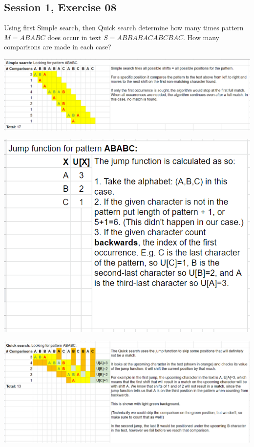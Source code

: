 \subsection{Session 1, Exercise 08}


Using first Simple search, then Quick search determine how many times pattern $M = ABABC$ does occur in text $S = ABBABACABCBAC$. How many comparisons are made in each case?



\includegraphics[width=\linewidth]{01/simple_search.png}

\includegraphics[width=0.5\linewidth]{01/jump_function.png}

\includegraphics[width=\linewidth]{01/quick_search.png}
